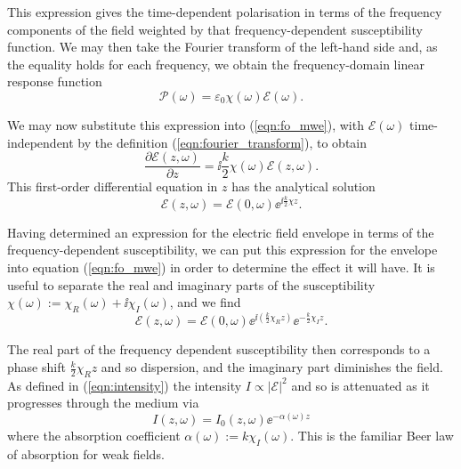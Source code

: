     This expression gives the time-dependent polarisation in terms of the
    frequency components of the field weighted by that frequency-dependent
    susceptibility function. We may then take the Fourier transform of the 
    left-hand side and, as the equality holds for each frequency, we obtain the
    frequency-domain linear response function
    \begin{equation}\label{eqn:lin_pol_freq} 
      \mathcal{P}(\omega) = \varepsilon_0 \chi(\omega) \mathcal{E}(\omega).
    \end{equation}

    We may now substitute this expression into (\ref{eqn:fo_mwe}), with
    $\mathcal{E}(\omega)$ time-independent by the definition
    (\ref{eqn:fourier_transform}), to obtain
    \begin{equation}\label{eqn:fo_mwe_linear}
      \frac{\partial \mathcal{E}(z, \omega)}{\partial z} = 
      \ii \frac{k}{2} \chi(\omega) \mathcal{E}(z, \omega).
    \end{equation}
    This first-order differential equation in $z$ has the analytical solution 
    \begin{equation}
      \mathcal{E}(z, \omega) = \mathcal{E}(0, \omega) \ee^{\ii \tfrac{k}{2} \chi z}.
    \end{equation}

    Having determined an expression for the electric field envelope in terms of
    the frequency-dependent susceptibility, we can put this expression for the
    envelope into equation (\ref{eqn:fo_mwe}) in order to determine the effect
    it will have. It is useful to separate the real and imaginary parts of the
    susceptibility $\chi(\omega) := \chi_R(\omega) + \ii \chi_I(\omega)$, and we
    find
    \begin{equation}\label{eqn:efield_susc_real_imag}
      \mathcal{E}(z, \omega) = 
      \mathcal{E}(0, \omega)    
      \ee^{\ii(\frac{k}{2} \chi_R z)} 
      \ee^{- \frac{k}{2} \chi_I z}.
    \end{equation}

    The real part of the frequency dependent susceptibility then corresponds to
    a phase shift $\frac{k}{2} \chi_R z$ and so dispersion, and the imaginary
    part diminishes the field. As defined in (\ref{eqn:intensity}) the intensity
    $I \propto |\mathcal{E}|^2$ and so is attenuated as it progresses through
    the medium via
    \begin{equation}\label{eqn:beer_law}
      I(z, \omega) = I_0(z, \omega) \ee^{-\alpha(\omega) z}
    \end{equation}
    where the absorption coefficient $\alpha(\omega) := k \chi_I(\omega)$. This
    is the familiar Beer law of absorption for weak fields.
    
